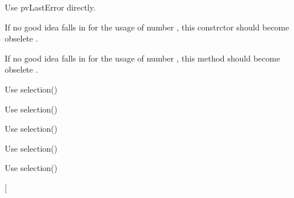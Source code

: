 
\begin{DoxyRefList}
\item[\label{deprecated__deprecated000008}%
\hypertarget{deprecated__deprecated000008}{}%
Member \hyperlink{classmdt_device_a6e7133e8665d9113d9423f4db44b1000}{mdt\-Device\-:\-:last\-Error\-W} ()]Use pv\-Last\-Error directly.  
\item[\label{deprecated__deprecated000010}%
\hypertarget{deprecated__deprecated000010}{}%
Member \hyperlink{classmdt_error_a377c175cc8e1aeae543cae2ecc5ca87b}{mdt\-Error\-:\-:mdt\-Error} (int number, const Q\-String \&text, level\-\_\-t level)]If no good idea falls in for the usage of number , this constrctor should become obselete .  
\item[\label{deprecated__deprecated000011}%
\hypertarget{deprecated__deprecated000011}{}%
Member \hyperlink{classmdt_error_ad233adb8efe4180b85f584c5afdd49fc}{mdt\-Error\-:\-:number} () const ]If no good idea falls in for the usage of number , this method should become obselete .  
\item[\label{deprecated__deprecated000003}%
\hypertarget{deprecated__deprecated000003}{}%
Member \hyperlink{classmdt_sql_selection_dialog_ae5582bd717078a137dd71d5a1b9cc9f9}{mdt\-Sql\-Selection\-Dialog\-:\-:add\-Selection\-Result\-Column} (const Q\-String \&field)]Use selection()  
\item[\label{deprecated__deprecated000007}%
\hypertarget{deprecated__deprecated000007}{}%
Member \hyperlink{classmdt_sql_selection_dialog_aab4943bc01e64f867791c15eea613e23}{mdt\-Sql\-Selection\-Dialog\-:\-:selected\-Data} (int row, const Q\-String \&field\-Name)]Use selection()  
\item[\label{deprecated__deprecated000004}%
\hypertarget{deprecated__deprecated000004}{}%
Member \hyperlink{classmdt_sql_selection_dialog_affdf9a9936509c8b6ca141b8ff415995}{mdt\-Sql\-Selection\-Dialog\-:\-:selected\-Data\-Record} ()]Use selection()  
\item[\label{deprecated__deprecated000005}%
\hypertarget{deprecated__deprecated000005}{}%
Member \hyperlink{classmdt_sql_selection_dialog_a23592c799f3b8945b3f5e72082dc265b}{mdt\-Sql\-Selection\-Dialog\-:\-:selection\-Result} ()]Use selection()  
\item[\label{deprecated__deprecated000006}%
\hypertarget{deprecated__deprecated000006}{}%
Member \hyperlink{classmdt_sql_selection_dialog_a85b7c1e3e156c141315d0873fa36d4b3}{mdt\-Sql\-Selection\-Dialog\-:\-:selection\-Results} ()]Use selection()  
\item[\label{deprecated__deprecated000001}%

\end{DoxyRefList}
